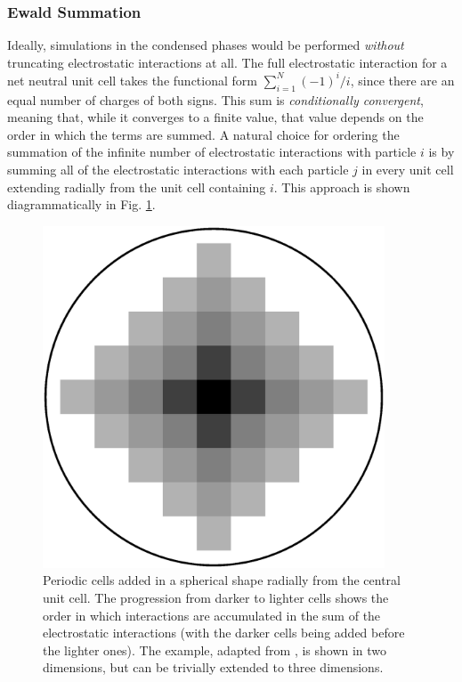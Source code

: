 \subsubsection{Ewald Summation}

Ideally, simulations in the condensed phases would be performed \emph{without}
truncating electrostatic interactions at all. The full electrostatic interaction
for a net neutral unit cell takes the functional form $\sum_{i=1}^N (-1)^i / i$,
since there are an equal number of charges of both signs. This sum is
\emph{conditionally convergent}, meaning that, while it converges to a finite
value, that value depends on the order in which the terms are summed.
\cite{Allen_Tildesley} A natural choice for ordering the summation of the
infinite number of electrostatic interactions with particle $i$ is by summing
all of the electrostatic interactions with each particle $j$ in every unit cell
extending radially from the unit cell containing $i$. This approach is shown
diagrammatically in Fig. \ref{fig2:PeriodicCells}.
\cite{Allen_Tildesley}

\begin{figure}
   \includegraphics[height=4in, angle=90, trim=0.1cm 2cm 0.1cm 2cm, clip=true]
                    {PeriodicCells.ps}
   \caption{Periodic cells added in a spherical shape radially from the central
            unit cell. The progression from darker to lighter cells shows the
            order in which interactions are accumulated in the sum of the
            electrostatic interactions (with the darker cells being added before
            the lighter ones). The example, adapted from
            \citeauthor{Allen_Tildesley}, is shown in two dimensions, but can
            be trivially extended to three dimensions. \cite{Allen_Tildesley}}
   \label{fig2:PeriodicCells}
\end{figure}

